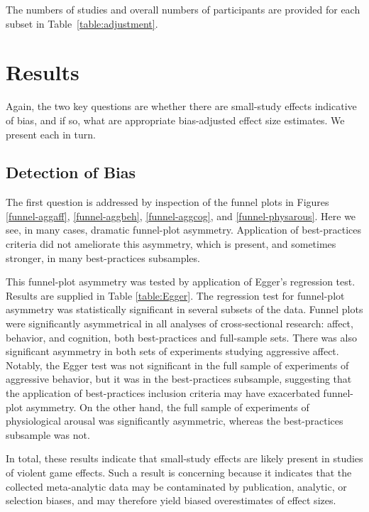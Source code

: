 \documentclass[man, mask]{apa6}
\begin{document}
The numbers of studies and overall numbers of participants are provided for each subset in Table~\ref{table:adjustment}.

\section{Results}
Again, the two key questions are whether there are small-study effects indicative of bias, and if so, what are appropriate bias-adjusted effect size estimates. We present each in turn.  

\subsection{Detection of Bias}
The first question is addressed by inspection of the funnel plots in Figures \ref{funnel-aggaff}, \ref{funnel-aggbeh}, \ref{funnel-aggcog}, and \ref{funnel-physarous}.  Here we see, in many cases, dramatic funnel-plot asymmetry. Application of best-practices criteria did not ameliorate this asymmetry, which is present, and sometimes stronger, in many best-practices subsamples.

This funnel-plot asymmetry was tested by application of Egger's regression test. Results are supplied in Table \ref{table:Egger}. 
The regression test for funnel-plot asymmetry was statistically significant in several subsets of the data. Funnel plots were significantly asymmetrical in all analyses of cross-sectional research: affect, behavior, and cognition, both best-practices and full-sample sets. There was also significant asymmetry in both sets of experiments studying aggressive affect.
Notably, the Egger test was not significant in the full sample of experiments of aggressive behavior, but it was in the best-practices subsample, suggesting that the application of best-practices inclusion criteria may have exacerbated funnel-plot asymmetry. On the other hand, the full sample of experiments of physiological arousal was significantly asymmetric, whereas the best-practices subsample was not.


In total, these results indicate that small-study effects are likely present in studies of violent game effects. Such a result is concerning because it indicates that the collected meta-analytic data may be contaminated by publication, analytic, or selection biases, and may therefore yield biased overestimates of effect sizes.
\end{document}
